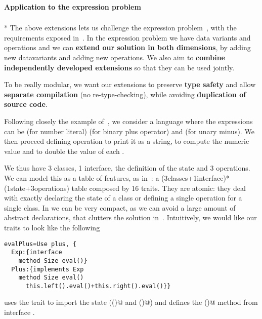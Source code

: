\paragraph{Application to the expression problem}${}_{}$\\*
The above extensions lets us challenge the expression problem~\cite{wadler1998expression},
with the requirements exposed in~\cite{scala}.
In the expression problem we have data variants and operations and we can
\textbf{extend our solution in both dimensions},
by adding new datavariants and adding new operations.
We also aim to \textbf{combine independently developed extensions} so
that they can be used jointly.

To be really modular, we want our extensions to
preserve \textbf{type safety}
and allow \textbf{separate compilation} (no re-type-checking),
while avoiding \textbf{duplication of source code}.

Following closely
the example of~\cite{},
we consider a language where the
expressions \Q@Exp@ can
be \Q@Num@ (for number literal)
\Q@Plus@ (for binary plus operator)
and \Q@Neg@ (for unary minus).
We then proceed defining operation
\Q@show@ to print it as a string,
 \Q@eval@ to compute the numeric value and 
\Q@double@ to double the value of each \Q@Num@.

We thus have 3 classes, 1 interface,
the definition of the state and 3 operations.
We can model this
as a table of features, as in~\cite{Deepfjig}:
a (3classes+1interface)*(1state+3operations)
table composed by 16 traits.
They are atomic: they deal with exactly 
declaring the state of a class
or defining a single operation for a single class.
In \name we can be very compact,
 as we can avoid a large amount of abstract declarations,
that clutters the solution in~\cite{Deepfjig}.
Intuitively, we would like our traits to look like the following 
\begin{lstlisting}
evalPlus=Use plus, {  
  Exp:{interface
    method Size eval()}
  Plus:{implements Exp
    method Size eval()
      this.left().eval()+this.right().eval()}}
\end{lstlisting}
\Q@basePlus@ uses the trait \Q@plus@ to import the state (\Q@left()@ and \Q@right()@)
and defines the \Q@eval()@ method from interface \Q@Exp@.

